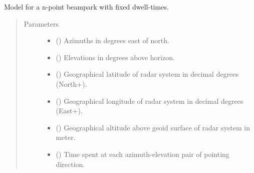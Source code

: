 \documentclass[letterpaper,10pt,english]{sphinxmanual}
\begin{document}
\begin{fulllineitems}
\label{\detokenize{modules/radar_scan_library:radar_scan_library.n_const_pointing_model}}
Model for a n-point beampark with fixed dwell-times.
\begin{quote}\begin{description}
\item[{Parameters}] \leavevmode\begin{itemize}
\item {} 
 () \textendash{} Azimuths in degrees east of north.

\item {} 
 () \textendash{} Elevations in degrees above horizon.

\item {} 
 () \textendash{} Geographical latitude of radar system in decimal degrees  (North+).

\item {} 
 () \textendash{} Geographical longitude of radar system in decimal degrees (East+).

\item {} 
 () \textendash{} Geographical altitude above geoid surface of radar system in meter.

\item {} 
 () \textendash{} Time spent at each azimuth-elevation pair of pointing direction.

\end{itemize}

\end{description}\end{quote}

\end{fulllineitems}

\end{document}
